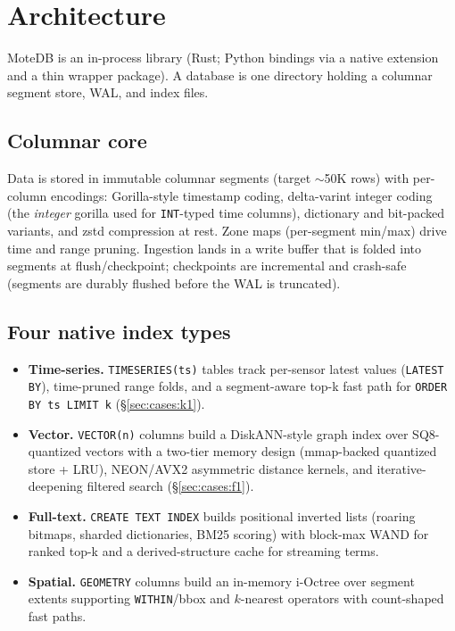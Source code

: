 \documentclass[10pt]{article}
\begin{document}
\section{Architecture}
\label{sec:arch}

MoteDB is an in-process library (Rust; Python bindings via a native
extension and a thin wrapper package). A database is one directory holding
a columnar segment store, WAL, and index files.

\subsection{Columnar core}
Data is stored in immutable columnar segments (target $\sim$50K rows)
with per-column encodings: Gorilla-style timestamp coding,
delta-varint integer coding (the \emph{integer} gorilla used for
\texttt{INT}-typed time columns), dictionary and bit-packed variants, and
zstd compression at rest. Zone maps (per-segment min/max) drive time and
range pruning. Ingestion lands in a write buffer that is folded into
segments at flush/checkpoint; checkpoints are incremental and crash-safe
(segments are durably flushed before the WAL is truncated).

\subsection{Four native index types}
\begin{itemize}
\item \textbf{Time-series.} \texttt{TIMESERIES(ts)} tables track per-sensor
latest values (\texttt{LATEST BY}), time-pruned range folds, and a
segment-aware top-k fast path for \texttt{ORDER BY ts LIMIT k}
(\S\ref{sec:cases:k1}).
\item \textbf{Vector.} \texttt{VECTOR(n)} columns build a DiskANN-style
graph index over SQ8-quantized vectors with a two-tier memory design
(mmap-backed quantized store + LRU), NEON/AVX2 asymmetric distance kernels,
and iterative-deepening filtered search (\S\ref{sec:cases:f1}).
\item \textbf{Full-text.} \texttt{CREATE TEXT INDEX} builds positional
inverted lists (roaring bitmaps, sharded dictionaries, BM25 scoring) with
block-max WAND for ranked top-k and a derived-structure cache for streaming
terms.
\item \textbf{Spatial.} \texttt{GEOMETRY} columns build an in-memory
i-Octree over segment extents supporting \texttt{WITHIN}/bbox and
$k$-nearest operators with count-shaped fast paths.
\end{itemize}
\end{document}
